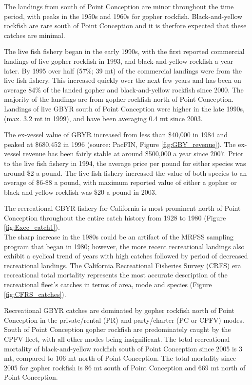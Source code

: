 \documentclass[12pt,]{article}
\begin{document}
The landings from south of Point Conception are minor throughout the
time period, with peaks in the 1950s and 1960s for gopher rockfish.
Black-and-yellow rockfish are rare south of Point Conception and it is
therfore expected that these catches are minimal.

The live fish fishery began in the early 1990s, with the first reported
commercial landings of live gopher rockfish in 1993, and
black-and-yellow rockfish a year later. By 1995 over half (57\%; 39 mt)
of the commercial landings were from the live fish fishery. This
increased quickly over the next few years and has been on average 84\%
of the landed gopher and black-and-yellow rockfish since 2000. The
majority of the landings are from gopher rockfish north of Point
Conception. Landings of live GBYR south of Point Conception were higher
in the late 1990s, (max. 3.2 mt in 1999), and have been averaging 0.4 mt
since 2003.

The ex-vessel value of GBYR increased from less than \$40,000 in 1984
and peaked at \$680,452 in 1996 (source: PacFIN, Figure
\ref{fig:GBY_revenue}). The ex-vessel revenue has been fairly stable at
around \$500,000 a year since 2007. Prior to the live fish fishery in
1994, the average price per pound for either species was around \$2 a
pound. The live fish fishery increased the value of both species to an
average of \$6-\$8 a pound, with maximum reported value of either a
gopher or black-and-yellow rockfish was \$20 a pound in 2003.

The recreational GBYR fishery for California is most prominent north of
Point Conception throughout the entire catch history from 1928 to 1980
(Figure \ref{fig:Exec_catch1}).\\
The sharp increase in the 1980s could be an artifact of the MRFSS
sampling program that began in 1980; however, the more recent
recreational landings also exhibit a cyclical trend of years with high
catches followed by period of decreased recreational landings. The
California Recreational Fisheries Survey (CRFS) era recreational total
mortality represents the most accurate description of the recreational
fleet's catches in terms of area, mode and species (Figure
\ref{fig:CFRS_catches}).

Recreational GBYR catches are dominated by gopher rockfish north of
Point Conception in the private/rental (PR) and party/charter (PC or
CPFV) modes. South of Point Conception gopher rockfish are predominately
caught by the CPFV fleet, with all other modes being insignificant. The
total recreational mortality of black-and-yellow rockfish south of Point
Conception since 2005 is 3 mt, compared to 106 mt north of Point
Conception. The total mortality since 2005 for gopher rockfish is 86 mt
south of Point Conception and 669 mt north of Point Conception.
\end{document}
